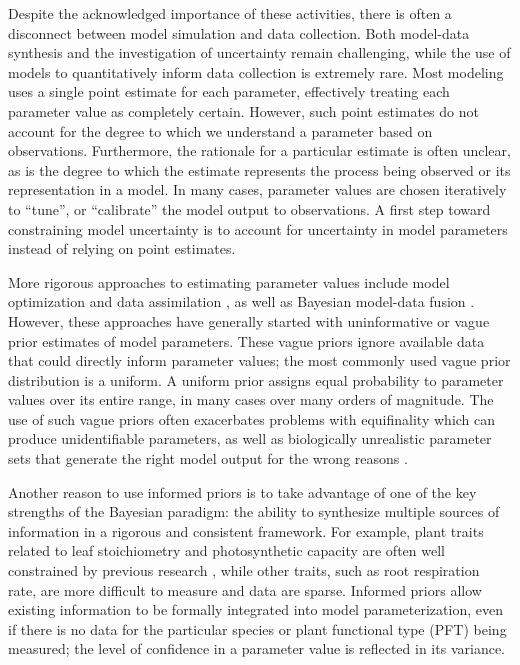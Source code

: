 \documentclass[12pt]{article}
\begin{document}
\begin{flushleft}
\begin{spacing}{1.9}
 Despite the acknowledged importance of these activities, there is often a disconnect between model simulation and data collection.
 Both model-data synthesis and the investigation of uncertainty remain challenging, while the use of models to quantitatively inform data collection is extremely rare.
 Most modeling uses a single point estimate for each parameter, effectively treating each parameter value as completely certain.
 However, such point estimates do not account for the degree to which we understand a parameter based on observations.
 Furthermore, the rationale for a particular estimate is often unclear, as is the degree to which the estimate represents the process being observed or its representation in a model.
 In many cases, parameter values are chosen iteratively to ``tune'', or ``calibrate'' the model output to observations.
 A first step toward constraining model uncertainty is to account for uncertainty in model parameters instead of relying on point estimates.

 More rigorous approaches to estimating parameter values include model optimization and data assimilation \citep{medvigy2009mse,reichstein2003ims}, as well as Bayesian model-data fusion \citep{luo2011efd}.
 However, these approaches have generally started with uninformative or vague prior estimates of model parameters.
 These vague priors ignore available data that could directly inform parameter values; the most commonly used  vague prior distribution is a uniform.
 A uniform prior assigns equal probability to parameter values over its entire range, in many cases over many orders of magnitude.
 The use of such vague priors often exacerbates problems with equifinality \citep{richardson2005sme,williams2009ils,luo2009pic} which can produce unidentifiable parameters, as well as biologically unrealistic parameter sets that generate the right model output for the wrong reasons \citep{beven2001eda,beven2006met,williams2009ils}.

 Another reason to use informed priors is to take advantage of one of the key strengths of the Bayesian paradigm: the ability to synthesize multiple sources of information in a rigorous and consistent framework.
 For example, plant traits related to leaf stoichiometry and photosynthetic capacity are often well constrained by previous research \citep{skillman2008qyv,reich2004gpp,wright2004wwl,wullschleger1993blc}, while other traits, such as root respiration rate, are more difficult to measure and data are sparse.
 Informed priors allow existing information to be formally integrated into model parameterization, even if there is no data for the particular species or plant functional type (PFT) being measured; the level of confidence in a parameter value is reflected in its variance.


\end{spacing}
\end{flushleft}
\end{document}

